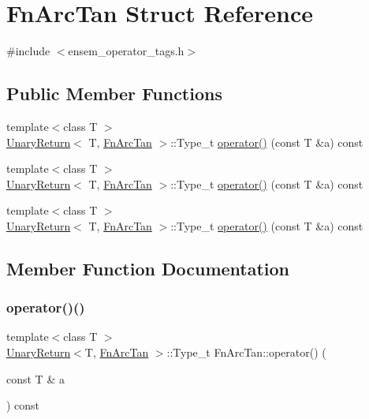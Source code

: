 \hypertarget{structFnArcTan}{}\section{Fn\+Arc\+Tan Struct Reference}
\label{structFnArcTan}


{\ttfamily \#include $<$ensem\+\_\+operator\+\_\+tags.\+h$>$}

\subsection*{Public Member Functions}
\begin{DoxyCompactItemize}
\item 
{\footnotesize template$<$class T $>$ }\\\mbox{\hyperlink{structUnaryReturn}{Unary\+Return}}$<$ T, \mbox{\hyperlink{structFnArcTan}{Fn\+Arc\+Tan}} $>$\+::Type\+\_\+t \mbox{\hyperlink{structFnArcTan_a7e6a58ff73a64fb87d8a8a232050a225}{operator()}} (const T \&a) const
\item 
{\footnotesize template$<$class T $>$ }\\\mbox{\hyperlink{structUnaryReturn}{Unary\+Return}}$<$ T, \mbox{\hyperlink{structFnArcTan}{Fn\+Arc\+Tan}} $>$\+::Type\+\_\+t \mbox{\hyperlink{structFnArcTan_a7e6a58ff73a64fb87d8a8a232050a225}{operator()}} (const T \&a) const
\item 
{\footnotesize template$<$class T $>$ }\\\mbox{\hyperlink{structUnaryReturn}{Unary\+Return}}$<$ T, \mbox{\hyperlink{structFnArcTan}{Fn\+Arc\+Tan}} $>$\+::Type\+\_\+t \mbox{\hyperlink{structFnArcTan_a7e6a58ff73a64fb87d8a8a232050a225}{operator()}} (const T \&a) const
\end{DoxyCompactItemize}


\subsection{Member Function Documentation}
\mbox{\label{structFnArcTan_a7e6a58ff73a64fb87d8a8a232050a225}} 
\subsubsection{\texorpdfstring{operator()()}{operator()()}\hspace{0.1cm}{\footnotesize\ttfamily [1/3]}}
{\footnotesize\ttfamily template$<$class T $>$ \\
\mbox{\hyperlink{structUnaryReturn}{Unary\+Return}}$<$T, \mbox{\hyperlink{structFnArcTan}{Fn\+Arc\+Tan}} $>$\+::Type\+\_\+t Fn\+Arc\+Tan\+::operator() (\begin{DoxyParamCaption}\item[{const T \&}]{a }\end{DoxyParamCaption}) const\hspace{0.3cm}{\ttfamily [inline]}}

